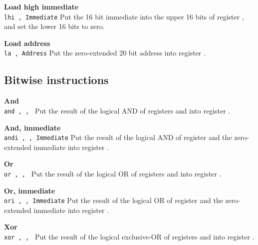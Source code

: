 \noindent
{\bf Load high immediate}\\
\noindent
\texttt{lhi \regd, Immediate}
Put the 16 bit immediate into the upper 16 bits of register \regd{},
and set the lower 16 bits to zero.
\vspace{3ex}

\noindent
{\bf Load address}\\
\noindent
\texttt{la \regd, Address}
Put the zero-extended 20 bit address into register \regd{}.
\vspace{3ex}
\newpage

\subsection{Bitwise instructions}

\noindent
{\bf And}\\
\noindent
\texttt{and \regd, \regs, \regt}
Put the result of the logical AND of registers \regs{} and \regt{} into register \regd{}.
\vspace{3ex}

\noindent
{\bf And, immediate}\\
\noindent
\texttt{andi \regd, \regs, Immediate}
Put the result of the logical AND of register \regs{} and the zero-extended immediate into register \regd{}.
\vspace{3ex}

\noindent
{\bf Or}\\
\noindent
\texttt{or \regd, \regs, \regt}
Put the result of the logical OR of registers \regs{} and \regt{} into register \regd{}.
\vspace{3ex}

\noindent
{\bf Or, immediate}\\
\noindent
\texttt{ori \regd, \regs, Immediate}
Put the result of the logical OR of register \regs{} and the zero-extended immediate into register \regd{}.
\vspace{3ex}

\noindent
{\bf Xor}\\
\noindent
\texttt{xor \regd, \regs, \regt}
Put the result of the logical exclusive-OR of registers \regs{} and \regt{} into register \regd{}.
\vspace{3ex}
\newpage

